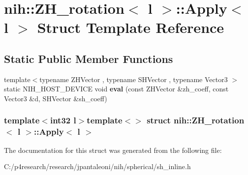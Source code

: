 \hypertarget{structnih_1_1_z_h__rotation_1_1_apply_3_01l_01_4}{
\section{nih\-:\-:\-Z\-H\-\_\-rotation$<$ l $>$\-:\-:\-Apply$<$ l $>$ \-Struct \-Template \-Reference}
\label{structnih_1_1_z_h__rotation_1_1_apply_3_01l_01_4}
}
\subsection*{\-Static \-Public \-Member \-Functions}
\begin{DoxyCompactItemize}
\item 
\hypertarget{structnih_1_1_z_h__rotation_1_1_apply_3_01l_01_4_a9ca1c3634c8256ce692a9263ac48d2a7}{
{\footnotesize template$<$typename Z\-H\-Vector , typename S\-H\-Vector , typename Vector3 $>$ }\\static \-N\-I\-H\-\_\-\-H\-O\-S\-T\-\_\-\-D\-E\-V\-I\-C\-E void {\bfseries eval} (const \-Z\-H\-Vector \&zh\-\_\-coeff, const \-Vector3 \&d, \-S\-H\-Vector \&sh\-\_\-coeff)}
\label{structnih_1_1_z_h__rotation_1_1_apply_3_01l_01_4_a9ca1c3634c8256ce692a9263ac48d2a7}

\end{DoxyCompactItemize}
\subsubsection*{template$<$int32 l$>$template$<$$>$ struct nih\-::\-Z\-H\-\_\-rotation$<$ l $>$\-::\-Apply$<$ l $>$}



\-The documentation for this struct was generated from the following file\-:\begin{DoxyCompactItemize}
\item 
\-C\-:/p4research/research/jpantaleoni/nih/spherical/sh\-\_\-inline.\-h\end{DoxyCompactItemize}
